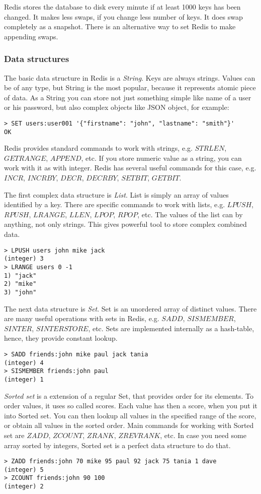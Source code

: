 Redis stores the database to disk every minute if at least 1000 keys has been changed.
It makes less swaps, if you change less number of keys.
It does swap completely as a snapshot.
There is an alternative way to set Redis to make appending swaps.

\subsubsection{Data structures}

The basic data structure in Redis is a \textit{String}.
Keys are always strings.
Values can be of any type, but String is the most popular, because it represents atomic piece of data.
As a String you can store not just something simple like name of a user or his password, but also complex objects like JSON object, for example:
\begin{verbatim}
> SET users:user001 '{"firstname": "john", "lastname": "smith"}'
OK
\end{verbatim}
Redis provides standard commands to work with strings, e.g. $STRLEN$, $GETRANGE$, $APPEND$, etc.
If you store numeric value as a string, you can work with it as with integer.
Redis has several useful commands for this case, e.g. $INCR$, $INCRBY$, $DECR$, $DECRBY$, $SETBIT$, $GETBIT$.

The first complex data structure is \textit{List}.
List is simply an array of values identified by a key.
There are specific commands to work with lists, e.g. $LPUSH$, $RPUSH$, $LRANGE$, $LLEN$, $LPOP$, $RPOP$, etc.
The values of the list can by anything, not only strings.
This gives powerful tool to store complex combined data.
\begin{verbatim}
> LPUSH users john mike jack
(integer) 3
> LRANGE users 0 -1
1) "jack"
2) "mike"
3) "john"
\end{verbatim}

The next data structure is \textit{Set}.
Set is an unordered array of distinct values.
There are many useful operations with sets in Redis, e.g. $SADD$, $SISMEMBER$, $SINTER$, $SINTERSTORE$, etc.
Sets are implemented internally as a hash-table, hence, they provide constant lookup.
\begin{verbatim}
> SADD friends:john mike paul jack tania
(integer) 4
> SISMEMBER friends:john paul
(integer) 1 
\end{verbatim}

\textit{Sorted set} is a extension of a regular Set, that provides order for its elements.
To order values, it uses so called scores.
Each value has then a score, when you put it into Sorted set.
You can then lookup all values in the specified range of the score, or obtain all values in the sorted order.
Main commands for working with Sorted set are $ZADD$, $ZCOUNT$, $ZRANK$, $ZREVRANK$, etc.
In case you need some array sorted by integers, Sorted set is a perfect data structure to do that.
\begin{verbatim}
> ZADD friends:john 70 mike 95 paul 92 jack 75 tania 1 dave
(integer) 5
> ZCOUNT friends:john 90 100
(integer) 2
\end{verbatim}

